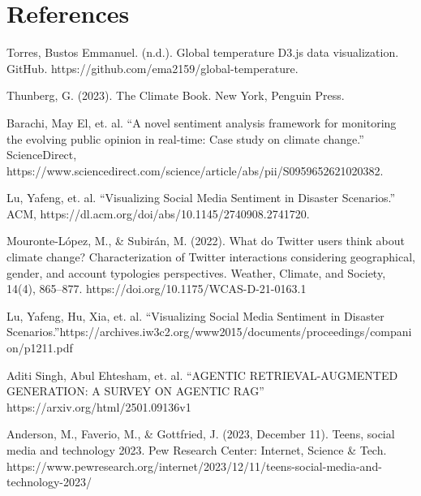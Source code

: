 \documentclass[pdflatex,sn-mathphys-num]{sn-jnl}%
\theoremstyle{thmstyleone}%
\theoremstyle{thmstyletwo}%
\theoremstyle{thmstylethree}%
\begin{document}
\newpage


\section{References}\label{sec9} Torres, Bustos Emmanuel. (n.d.). Global temperature D3.js data visualization. GitHub. https://github.com/ema2159/global-temperature.

Thunberg, G. (2023). The Climate Book. New York, Penguin Press.

Barachi, May El, et. al. “A novel sentiment analysis framework for monitoring the evolving public opinion in real-time: Case study on climate change.” ScienceDirect, https://www.sciencedirect.com/science/article/abs/pii/S0959652621020382. 

Lu, Yafeng, et. al. “Visualizing Social Media Sentiment in Disaster Scenarios.” ACM, https://dl.acm.org/doi/abs/10.1145/2740908.2741720.

Mouronte-López, M., \& Subirán, M. (2022). What do Twitter users think about climate change? Characterization of Twitter interactions considering geographical, gender, and account typologies perspectives. Weather, Climate, and Society, 14(4), 865–877. https://doi.org/10.1175/WCAS-D-21-0163.1

Lu, Yafeng, Hu, Xia, et. al. “Visualizing Social Media Sentiment in Disaster Scenarios.”https://archives.iw3c2.org/www2015/documents/proceedings/companion/p1211.pdf

Aditi Singh, Abul Ehtesham, et. al. “AGENTIC RETRIEVAL-AUGMENTED GENERATION: A SURVEY ON AGENTIC RAG” https://arxiv.org/html/2501.09136v1

Anderson, M., Faverio, M., \& Gottfried, J. (2023, December 11). Teens, social media 
and technology 2023. Pew Research Center: Internet, Science \& Tech. https://www.pewresearch.org/internet/2023/12/11/teens-social-media-and-technology-2023/


\end{document}
